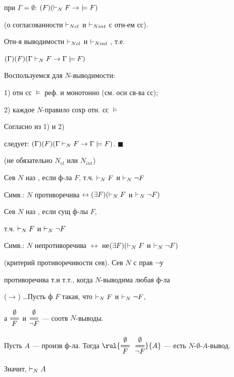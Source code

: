 при $\Gamma=\emptyset$: $(F)(\vdash_{N} F\to\ \models F)$\par
{} (о согласованности $\vdash_{Ncl}$ и $\vdash_{Nint}$ с отн-ем сс).\par
Отн-я выводимости $\vdash_{Ncl}$ и $\vdash_{Nint}$ , т.е.\par
\hspace*{20mm}$(\Gamma)(F)(\Gamma\vdash_{N} F\to\Gamma\models F)$\par
\dvo Воспользуемся  для $N$-выводимости:\par
1) отн сс $\models$ реф. и монотонно (см. осн св-ва сс);\par
2) каждое $N$-правило сохр отн. сс $\models$\par
\hspace*{5mm}\par
Согласно  из 1) и 2)\par
следует: \hspace{10mm}$(\Gamma)(F)(\Gamma\vdash_{N} F\to\Gamma\models F)$. $\blacksquare$\par
{}\par
{} (не обязательно $N_{cl}$ или $N_{int}$)\par
\opr Сев $N$ наз , если  ф-ла $F$, т.ч. $\vdash_{N} F$ и $\vdash_{N}\neg F$\par
Симв.: $N$ противоречива $\leftrightarrow(\exists F)(\vdash_{N} F$ и $\vdash_{N}\neg F)$\par
\opr Сев $N$ наз , если  сущ ф-лы $F$,\par
\hspace*{10mm}т.ч. $\vdash_{N} F$ и $\vdash_{N}\neg F$\par
Симв.: $N$ непротиворечива $\leftrightarrow$ не$(\exists F)(\vdash_{N} F$ и $\vdash_{N}\neg F)$\par
{} (критерий противоречивости сев). Сев $N$ с прав $\neg$у\par
противоречива т.и т.т., когда $N$-выводима любая ф-ла\par
\dvo ($\to$) \dots Пусть ф $F$ такая, что $\vdash_{N} F$ и $\vdash_{N}\neg F$,\par
а $\Dv{\emptyset}{F}$ и $\Dv{\emptyset}{\neg F}$ --- соотв $N$-выводы.\par
Пусть $A$ --- произв ф-ла. Тогда $\rul{\Dv{\emptyset}{F}\ \ \Dv{\emptyset}{\neg F}}{A}$ --- есть $N$-$\emptyset$-$A$-вывод.\par
Значит, $\vdash_{N} A$\par
